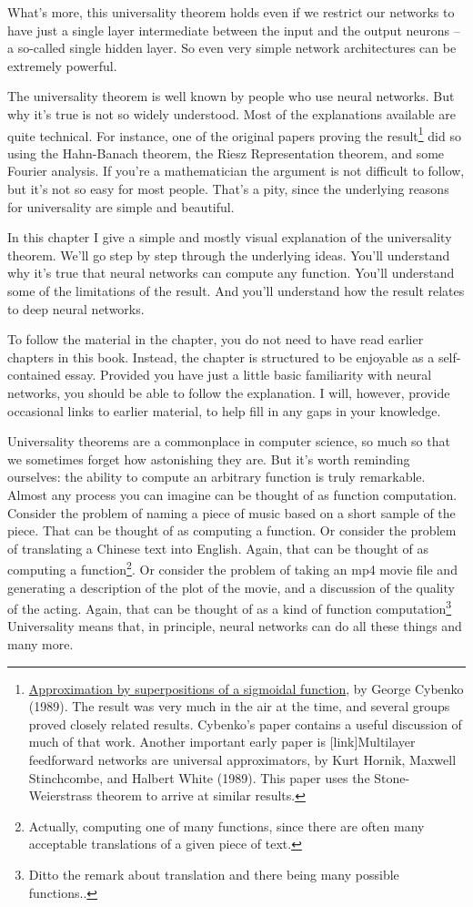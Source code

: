 \documentclass[a4paper,twoside,10pt]{book}
\begin{document}
What's more, this universality theorem holds even if we restrict our networks to have just a single layer intermediate between the input and the output neurons -- a so-called single hidden layer. So even very simple network architectures can be extremely powerful.

The universality theorem is well known by people who use neural networks. But why it's true is not so widely understood. Most of the explanations available are quite technical. For instance, one of the original papers proving the result\footnote{\href{http://www.dartmouth.edu/~gvc/Cybenko_MCSS.pdf}{Approximation by superpositions of a sigmoidal function}, by George Cybenko (1989). The result was very much in the air at the time, and several groups proved closely related results. Cybenko's paper contains a useful discussion of much of that work. Another important early paper is [link]Multilayer feedforward networks are universal approximators, by Kurt Hornik, Maxwell Stinchcombe, and Halbert White (1989). This paper uses the Stone-Weierstrass theorem to arrive at similar results.} did so using the Hahn-Banach theorem, the Riesz Representation theorem, and some Fourier analysis. If you're a mathematician the argument is not difficult to follow, but it's not so easy for most people. That's a pity, since the underlying reasons for universality are simple and beautiful.

In this chapter I give a simple and mostly visual explanation of the universality theorem. We'll go step by step through the underlying ideas. You'll understand why it's true that neural networks can compute any function. You'll understand some of the limitations of the result. And you'll understand how the result relates to deep neural networks.

To follow the material in the chapter, you do not need to have read earlier chapters in this book. Instead, the chapter is structured to be enjoyable as a self-contained essay. Provided you have just a little basic familiarity with neural networks, you should be able to follow the explanation. I will, however, provide occasional links to earlier material, to help fill in any gaps in your knowledge.

Universality theorems are a commonplace in computer science, so much so that we sometimes forget how astonishing they are. But it's worth reminding ourselves: the ability to compute an arbitrary function is truly remarkable. Almost any process you can imagine can be thought of as function computation. Consider the problem of naming a piece of music based on a short sample of the piece. That can be thought of as computing a function. Or consider the problem of translating a Chinese text into English. Again, that can be thought of as computing a function\footnote{Actually, computing one of many functions, since there are often many acceptable translations of a given piece of text.}. Or consider the problem of taking an mp4 movie file and generating a description of the plot of the movie, and a discussion of the quality of the acting. Again, that can be thought of as a kind of function computation\footnote{Ditto the remark about translation and there being many possible functions..} Universality means that, in principle, neural networks can do all these things and many more.
\end{document}
